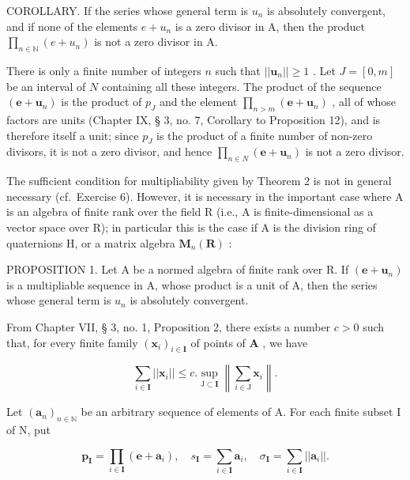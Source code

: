 COROLLARY. If the series whose general term is \(u_{n}\) is absolutely convergent, and if none of the elements \(e + u_{n}\) is a zero divisor in A, then the product \(\prod_{n \in \mathbb{N}} (e + u_{n})\) is not a zero divisor in A.

There is only a finite number of integers \(n\) such that \(||\boldsymbol{u}_n|| \geqslant 1\) . Let \(J = [0, m]\) be an interval of \(N\) containing all these integers. The product of the sequence \((\boldsymbol{e} + \boldsymbol{u}_n)\) is the product of \(p_J\) and the element \(\prod_{n > m} (\boldsymbol{e} + \boldsymbol{u}_n)\) , all of whose factors are units (Chapter IX, § 3, no. 7, Corollary to Proposition 12), and is therefore itself a unit; since \(p_J\) is the product of a finite number of non-zero divisors, it is not a zero divisor, and hence \(\prod_{n \in N} (\boldsymbol{e} + \boldsymbol{u}_n)\) is not a zero divisor.

The sufficient condition for multipliability given by Theorem 2 is not in general necessary (cf.~Exercise 6). However, it is necessary in the important case where A is an algebra of finite rank over the field R (i.e., A is finite-dimensional as a vector space over R); in particular this is the case if A is the division ring of quaternions H, or a matrix algebra \(\mathbf{M}_n(\mathbf{R})\) :

PROPOSITION 1. Let A be a normed algebra of finite rank over R. If \((\boldsymbol{e} + \boldsymbol{u}_{n})\) is a multipliable sequence in A, whose product is a unit of A, then the series whose general term is \(u_{n}\) is absolutely convergent.

From Chapter VII, § 3, no. 1, Proposition 2, there exists a number \(c > 0\) such that, for every finite family \((\pmb{x}_i)_{i \in \mathbf{I}}\) of points of \(\mathbf{A}\) , we have

\[
\sum_ {i \in \mathbf {I}} | | \boldsymbol {x} _ {i} | | \leqslant c. \sup _ {\mathrm{J} \subset \mathbf {I}} \left\| \sum_ {i \in \mathrm{J}} \boldsymbol {x} _ {i} \right\|.\tag{1}
\]

Let \((\pmb{a}_n)_{n\in \mathbb{N}}\) be an arbitrary sequence of elements of A. For each finite subset I of N, put

\[
\boldsymbol {p} _ {\mathbf {I}} = \prod_ {i \in \mathbf {I}} (\boldsymbol {e} + \boldsymbol {a} _ {i}), \quad s _ {\mathbf {I}} = \sum_ {i \in \mathbf {I}} \boldsymbol {a} _ {i}, \quad \sigma_ {\mathbf {I}} = \sum_ {i \in \mathbf {I}} | | \boldsymbol {a} _ {i} | |.
\]

